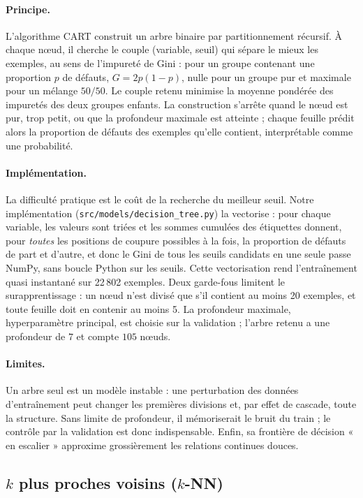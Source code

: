 \paragraph{Principe.}
L'algorithme CART \cite{breiman1984cart} construit un arbre binaire par
partitionnement récursif. À chaque n\oe ud, il cherche le couple (variable,
seuil) qui sépare le mieux les exemples, au sens de l'impureté de Gini : pour
un groupe contenant une proportion $p$ de défauts, $G = 2p(1-p)$, nulle pour un
groupe pur et maximale pour un mélange $50/50$. Le couple retenu minimise la
moyenne pondérée des impuretés des deux groupes enfants. La construction
s'arrête quand le n\oe ud est pur, trop petit, ou que la profondeur maximale
est atteinte ; chaque feuille prédit alors la proportion de défauts des
exemples qu'elle contient, interprétable comme une probabilité.

\paragraph{Implémentation.}
La difficulté pratique est le coût de la recherche du meilleur seuil. Notre
implémentation (\texttt{src/models/decision\_tree.py}) la vectorise : pour
chaque variable, les valeurs sont triées et les sommes cumulées des étiquettes
donnent, pour \emph{toutes} les positions de coupure possibles à la fois, la
proportion de défauts de part et d'autre, et donc le Gini de tous les seuils
candidats en une seule passe NumPy, sans boucle Python sur les seuils. Cette
vectorisation rend l'entraînement quasi instantané sur 22\,802 exemples. Deux
garde-fous limitent le surapprentissage : un n\oe ud n'est divisé que s'il
contient au moins 20 exemples, et toute feuille doit en contenir au moins 5.
La profondeur maximale, hyperparamètre principal, est choisie sur la
validation ; l'arbre retenu a une profondeur de $7$ et compte $105$ n\oe uds.

\paragraph{Limites.}
Un arbre seul est un modèle instable : une perturbation des données
d'entraînement peut changer les premières divisions et, par effet de cascade,
toute la structure. Sans limite de profondeur, il mémoriserait le bruit du
train ; le contrôle par la validation est donc indispensable. Enfin, sa
frontière de décision « en escalier » approxime grossièrement les relations
continues douces.

\subsection{$k$ plus proches voisins ($k$-NN)}
\label{subsec:knn}

